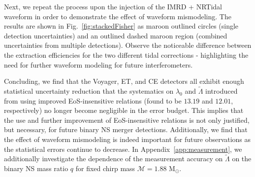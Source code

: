 \documentclass[prd,twocolumn,nofootinbib,superscriptaddress,amsmath,amssymb]{revtex4-1}
\begin{document}
Next, we repeat the process upon the injection of the IMRD + NRTidal waveform in order to demonstrate the effect of waveform mismodeling.
The results are shown in Fig.~\ref{fig:stackedFisher} as maroon outlined circles (single detection uncertainties) and an outlined dashed maroon region (combined uncertainties from multiple detections).
Observe the noticeable difference between the extraction efficiencies for the two different tidal corrections - highlighting the need for further waveform modeling for future interferometers.

Concluding, we find that the Voyager, ET, and CE detectors all exhibit enough statistical uncertainty reduction that the systematics on $\lambda_0$ and $\tilde\Lambda$ introduced from using improved EoS-insensitive relations (found to be $13.19$ and $12.01$, respectively) no longer become negligible in the error budget.
This implies that the use and further improvement of EoS-insensitive relations is not only justified, but necessary, for future binary NS merger detections.
Additionally, we find that the effect of waveform mismodeling is indeed important for future observations as the statistical errors continue to decrease.
In Appendix~\ref{app:measurement}, we additionally investigate the dependence of the measurement accuracy on $\tilde\Lambda$ on the binary NS mass ratio $q$ for fixed chirp mass $\mathcal{M}=1.88\text{ M}_{\odot}$.

\end{document}
